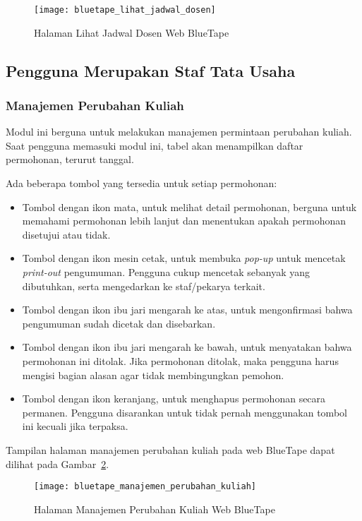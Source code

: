 \begin{figure}[H]
    \centering  
    \texttt{[image: bluetape\_lihat\_jadwal\_dosen]}
    \caption[Halaman Lihat Jadwal Dosen Web BlueTape]{Halaman Lihat Jadwal Dosen Web BlueTape}
    \label{fig:bluetape_lihat_jadwal_dosen}
\end{figure}

\subsection{Pengguna Merupakan Staf Tata Usaha}
\label{sec:bluetape_staf_tata_usaha}

\subsubsection{Manajemen Perubahan Kuliah}
\label{sec:bluetape_manajemen_perubahan_kuliah}
Modul ini berguna untuk melakukan manajemen permintaan perubahan kuliah. Saat pengguna memasuki modul ini, tabel akan menampilkan daftar permohonan, terurut tanggal.

Ada beberapa tombol yang tersedia untuk setiap permohonan:
\begin{itemize}
	\item Tombol dengan ikon mata, untuk melihat detail permohonan, berguna untuk memahami permohonan lebih lanjut dan menentukan apakah permohonan disetujui atau tidak.
	\item Tombol dengan ikon mesin cetak, untuk membuka \textit{pop-up} untuk mencetak \textit{print-out} pengumuman. Pengguna cukup mencetak sebanyak yang dibutuhkan, serta mengedarkan ke staf/pekarya terkait.
	\item Tombol dengan ikon ibu jari mengarah ke atas, untuk mengonfirmasi bahwa pengumuman sudah dicetak dan disebarkan.
	\item Tombol dengan ikon ibu jari mengarah ke bawah, untuk menyatakan bahwa permohonan ini ditolak. Jika permohonan ditolak, maka pengguna harus mengisi bagian alasan agar tidak membingungkan pemohon.
	\item Tombol dengan ikon keranjang, untuk menghapus permohonan secara permanen. Pengguna disarankan untuk tidak pernah menggunakan tombol ini kecuali jika terpaksa.
\end{itemize}

Tampilan halaman manajemen perubahan kuliah pada web BlueTape dapat dilihat pada \mbox{Gambar \ref{fig:bluetape_manajemen_perubahan_kuliah}}.

\begin{figure}[H]
    \centering  
    \texttt{[image: bluetape\_manajemen\_perubahan\_kuliah]}
    \caption[Halaman Manajemen Perubahan Kuliah Web BlueTape]{Halaman Manajemen Perubahan Kuliah Web BlueTape}
    \label{fig:bluetape_manajemen_perubahan_kuliah}
\end{figure}

